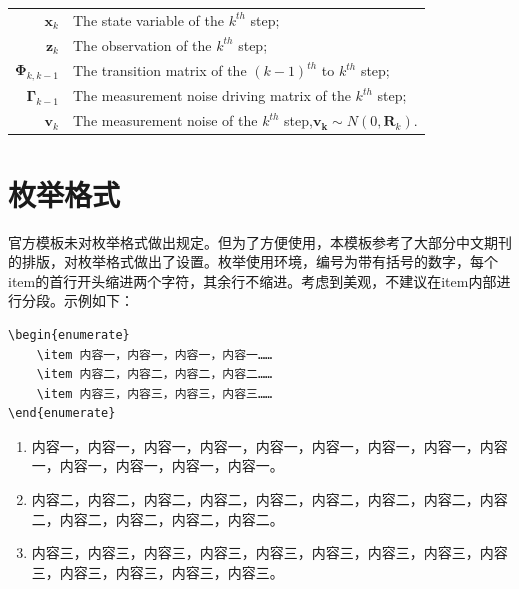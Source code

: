 {\begin{spacing}{1.5}
\begin{tabular}{r@{---}l}
  $\bm{x}_k$  & The state variable of the $k^{th}$ step;\\
  $\bm{z}_k$  & The observation of the $k^{th}$ step; \\
  $\bm{\Phi}_{k,k-1}$ & The transition matrix of the $(k-1)^{th}$ to $k^{th}$ step; \\
  $\bm{\Gamma}_{k-1}$  & The measurement noise driving matrix of the $k^{th}$ step; \\
  $\bm{v}_k$ & The measurement noise of the $k^{th}$ step,$\bm{v_k}\sim N(0,\bm{R}_k)$.
\end{tabular}

\newpage
\section{枚举格式}
官方模板未对枚举格式做出规定。但为了方便使用，本模板参考了大部分中文期刊的排版，对枚举格式做出了设置。枚举使用环境，编号为带有括号的数字，每个item的首行开头缩进两个字符，其余行不缩进。考虑到美观，不建议在item内部进行分段。示例如下：

\vspace{-4ex}
\begin{lstlisting}
\begin{enumerate}
	\item 内容一，内容一，内容一，内容一……
	\item 内容二，内容二，内容二，内容二……
	\item 内容三，内容三，内容三，内容三……
\end{enumerate}
\end{lstlisting}
\vspace{-1ex}

\begin{enumerate}
	\item 内容一，内容一，内容一，内容一，内容一，内容一，内容一，内容一，内容一，内容一，内容一，内容一，内容一。
	\item 内容二，内容二，内容二，内容二，内容二，内容二，内容二，内容二，内容二，内容二，内容二，内容二，内容二。
	\item 内容三，内容三，内容三，内容三，内容三，内容三，内容三，内容三，内容三，内容三，内容三，内容三，内容三。
\end{enumerate}


\end{spacing}}
